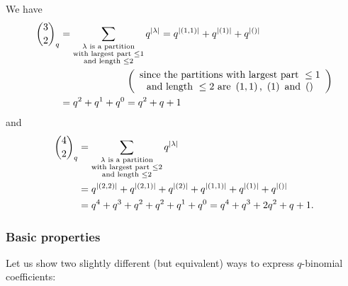\begin{example}
We have%
\begin{align*}
\dbinom{3}{2}_{q}  &  =\sum_{\substack{\lambda\text{ is a partition}%
\\\text{with largest part }\leq1\\\text{and length }\leq2}}q^{\left\vert
\lambda\right\vert }=q^{\left\vert \left(  1,1\right)  \right\vert
}+q^{\left\vert \left(  1\right)  \right\vert }+q^{\left\vert \left(
{}\right)  \right\vert }\\
&  \ \ \ \ \ \ \ \ \ \ \ \ \ \ \ \ \ \ \ \ \left(
\begin{array}
[c]{c}%
\text{since the partitions with largest part }\leq1\\
\text{and length }\leq2\text{ are }\left(  1,1\right)  \text{, }\left(
1\right)  \text{ and }\left(  {}\right)
\end{array}
\right) \\
&  =q^{2}+q^{1}+q^{0}=q^{2}+q+1
\end{align*}
and%
\begin{align*}
\dbinom{4}{2}_{q}  &  =\sum_{\substack{\lambda\text{ is a partition}%
\\\text{with largest part }\leq2\\\text{and length }\leq2}}q^{\left\vert
\lambda\right\vert }\\
&  =q^{\left\vert \left(  2,2\right)  \right\vert }+q^{\left\vert \left(
2,1\right)  \right\vert }+q^{\left\vert \left(  2\right)  \right\vert
}+q^{\left\vert \left(  1,1\right)  \right\vert }+q^{\left\vert \left(
1\right)  \right\vert }+q^{\left\vert \left(  {}\right)  \right\vert }\\
&  =q^{4}+q^{3}+q^{2}+q^{2}+q^{1}+q^{0}=q^{4}+q^{3}+2q^{2}+q+1.
\end{align*}

\end{example}

\subsubsection{Basic properties}

Let us show two slightly different (but equivalent) ways to express
$q$-binomial coefficients:

